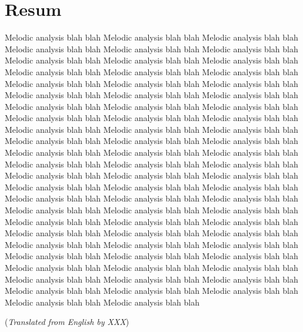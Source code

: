 
\chapter{Resum}

Melodic analysis blah blah Melodic analysis blah blah Melodic analysis blah blah Melodic analysis blah blah Melodic analysis blah blah Melodic analysis blah blah Melodic analysis blah blah Melodic analysis blah blah Melodic analysis blah blah Melodic analysis blah blah Melodic analysis blah blah Melodic analysis blah blah Melodic analysis blah blah Melodic analysis blah blah Melodic analysis blah blah Melodic analysis blah blah Melodic analysis blah blah Melodic analysis blah blah Melodic analysis blah blah Melodic analysis blah blah Melodic analysis blah blah Melodic analysis blah blah Melodic analysis blah blah Melodic analysis blah blah Melodic analysis blah blah Melodic analysis blah blah Melodic analysis blah blah Melodic analysis blah blah Melodic analysis blah blah Melodic analysis blah blah Melodic analysis blah blah Melodic analysis blah blah Melodic analysis blah blah Melodic analysis blah blah Melodic analysis blah blah Melodic analysis blah blah Melodic analysis blah blah Melodic analysis blah blah Melodic analysis blah blah Melodic analysis blah blah Melodic analysis blah blah Melodic analysis blah blah Melodic analysis blah blah Melodic analysis blah blah Melodic analysis blah blah Melodic analysis blah blah Melodic analysis blah blah Melodic analysis blah blah Melodic analysis blah blah Melodic analysis blah blah Melodic analysis blah blah Melodic analysis blah blah Melodic analysis blah blah Melodic analysis blah blah Melodic analysis blah blah Melodic analysis blah blah Melodic analysis blah blah Melodic analysis blah blah Melodic analysis blah blah Melodic analysis blah blah Melodic analysis blah blah Melodic analysis blah blah Melodic analysis blah blah Melodic analysis blah blah Melodic analysis blah blah Melodic analysis blah blah Melodic analysis blah blah Melodic analysis blah blah Melodic analysis blah blah Melodic analysis blah blah Melodic analysis blah blah 


\vfill
{\noindent (\emph{Translated from English by XXX})}